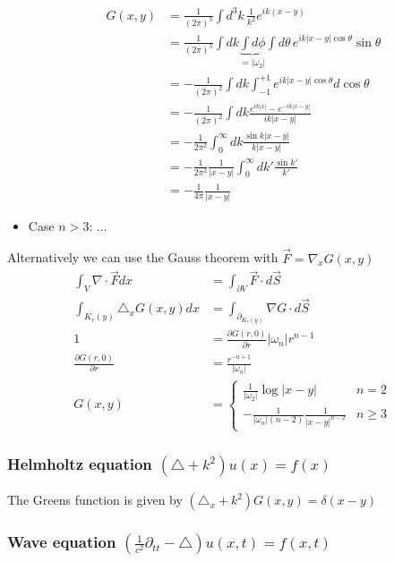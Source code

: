 \documentclass[10pt,a4paper]{article}
\theoremstyle{definition}
\begin{document}
\begin{itemize}
\begin{align}
            G(x,y)&=\frac{1}{(2\pi)^{3}}\int d^3k\,\frac{1}{k^2}e^{ik(x-y)}\\
            &=\frac{1}{(2\pi)^{3}}\int dk\underbrace{\int d\phi}_{=|\omega_2|} \int d\theta\,e^{ik|x-y|\cos\theta}\sin\theta\\
            &=-\frac{1}{(2\pi)^{2}}\int dk \int_{-1}^{+1} e^{ik|x-y|\cos\theta}d\cos\theta\\
            &=-\frac{1}{(2\pi)^{2}}\int dk \frac{e^{ik|x|}-e^{-ik|x-y|}}{ik|x-y|}\\
            &=-\frac{1}{2\pi^2}\int_0^\infty dk \frac{\sin k|x-y|}{k|x-y|}\\
            &=-\frac{1}{2\pi^2}\frac{1}{|x-y|}\int_0^\infty dk' \frac{\sin k'}{k'}\\
            &=-\frac{1}{4\pi}\frac{1}{|x-y|}
        \end{align}
        \item Case $n>3$:
        ...
        
    \end{itemize}

Alternatively we can use the Gauss theorem with $\vec{F}=\nabla_x G(x,y)$
\begin{align}
    \int_V \nabla\cdot \vec{F} dx&=\int_{\partial V} \vec{F}\cdot d\vec{S}\\
    \int_{K_r(y)} \triangle_x G(x,y) dx&=\int_{\partial _{K_r(y)}} \nabla G\cdot d\vec{S}\\
    1&=\frac{\partial G(r,0)}{\partial r}|\omega_{n}|r^{n-1}\\
    \frac{\partial G(r,0)}{\partial r} &= \frac{r^{-n+1}}{|\omega_n|}\\
    G(x,y)&=\left\{\begin{array}{cc}
         \frac{1}{|\omega_2|}\log{|x-y|}                    & n=2  \\
         -\frac{1}{|\omega_n|(n-2)}\frac{1}{|x-y|^{n-2}}    & n\ge3 
    \end{array}\right.
\end{align}

\subsubsection{Helmholtz equation \texorpdfstring{$(\triangle +k^2)u(x)= f(x)$}{TEXT}}
The Greens function is given by $(\triangle_x +k^2)G(x,y)=\delta(x-y)$


\subsubsection{Wave equation \texorpdfstring{$\left(\frac{1}{c^2}\partial_{tt}-\triangle\right) u(x,t)= f(x,t)$}{TEXT}}
\end{document}
